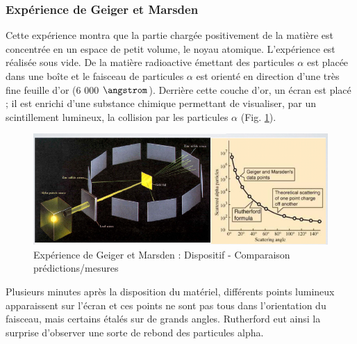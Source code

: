 \subsubsection{Expérience de Geiger et Marsden}
Cette expérience montra que la partie chargée positivement de la matière est concentrée en un espace de petit volume, le noyau atomique. L'expérience est réalisée sous vide. De la matière radioactive émettant des particules $\alpha$ est placée dans une boîte et le faisceau de particules $\alpha$ est orienté en direction d'une très fine feuille d'or (6 000 $\angstrom$). Derrière cette couche d'or, un écran est placé ; il est enrichi d'une substance chimique permettant de visualiser, par un scintillement lumineux, la collision par les particules $\alpha$ (Fig. \ref{fig:geiger_marsden}).

\begin{figure}[ht]
    \centering
    \includegraphics[scale=0.75]{Images1/geiger.PNG}
    \caption{Expérience de Geiger et Marsden : Dispositif - Comparaison prédictions/mesures}
    \label{fig:geiger_marsden}
\end{figure}

Plusieurs minutes après la disposition du matériel, différents points lumineux apparaissent sur l'écran et ces points ne sont pas tous dans l'orientation du faisceau, mais certains étalés sur de grands angles. Rutherford eut ainsi la surprise d'observer une sorte de rebond des particules alpha.

